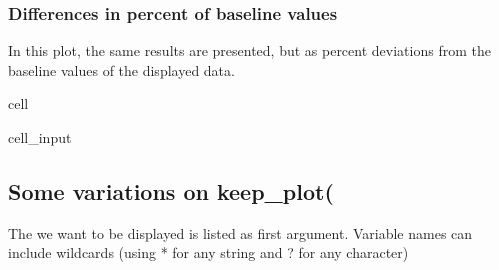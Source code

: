 \documentclass[letterpaper,10pt,english]{jupyterBook}
\begin{document}
\subsubsection{Differences in percent of baseline values}
\label{\detokenize{content/06_WBModels/LoadingWBModel:differences-in-percent-of-baseline-values}}
\sphinxAtStartPar
In this plot, the same results are presented, but as percent deviations from the baseline values of the displayed data.

\begin{sphinxuseclass}{cell}\begin{sphinxVerbatimInput}

\begin{sphinxuseclass}{cell_input}
\begin{sphinxVerbatim}[commandchars=\\\{\}]
 \PYGZbs{}
                \PYGZbs{}
\end{sphinxVerbatim}

\end{sphinxuseclass}\end{sphinxVerbatimInput}

\end{sphinxuseclass}

\subsection{Some variations on keep\_plot(}
\label{\detokenize{content/06_WBModels/LoadingWBModel:some-variations-on-keep-plot}}
\sphinxAtStartPar
The  we want to be displayed is listed as first argument. Variable names can include
wildcards (using * for any string and ? for any character)

\sphinxAtStartPar
{}
\end{document}
